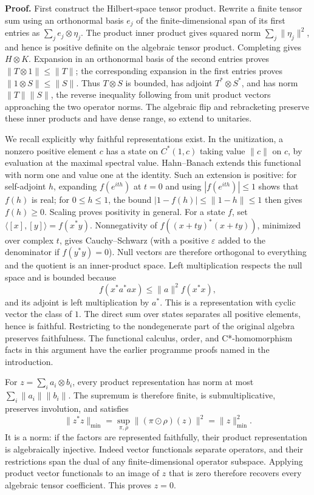 \documentclass[
  11pt,
]{article}
\begin{document}
\textbf{Proof.} First construct the Hilbert-space tensor product.
Rewrite a finite tensor sum using an orthonormal basis \(e_j\) of the
finite-dimensional span of its first entries as
\(\sum_j e_j\otimes\eta_j\). The product inner product gives squared
norm \(\sum_j\|\eta_j\|^2\), and hence is positive definite on the
algebraic tensor product. Completing gives \(H\otimes K\). Expansion in
an orthonormal basis of the second entries proves
\(\|T\otimes1\|\leq\|T\|\); the corresponding expansion in the first
entries proves \(\|1\otimes S\|\leq\|S\|\). Thus \(T\otimes S\) is
bounded, has adjoint \(T^*\otimes S^*\), and has norm \(\|T\|\|S\|\),
the reverse inequality following from unit product vectors approaching
the two operator norms. The algebraic flip and rebracketing preserve
these inner products and have dense range, so extend to unitaries.

We recall explicitly why faithful representations exist. In the
unitization, a nonzero positive element \(c\) has a state on
\(C^*(1,c)\) taking value \(\|c\|\) on \(c\), by evaluation at the
maximal spectral value. Hahn--Banach extends this functional with norm
one and value one at the identity. Such an extension is positive: for
self-adjoint \(h\), expanding \(f(e^{ith})\) at \(t=0\) and using
\(|f(e^{ith})|\leq1\) shows that \(f(h)\) is real; for \(0\leq h\leq1\),
the bound \(|1-f(h)|\leq\|1-h\|\leq1\) then gives \(f(h)\geq0\). Scaling
proves positivity in general. For a state \(f\), set
\(\langle[x],[y]\rangle=f(x^*y)\). Nonnegativity of
\(f((x+ty)^*(x+ty))\), minimized over complex \(t\), gives
Cauchy--Schwarz (with a positive \(\varepsilon\) added to the
denominator if \(f(y^*y)=0\)). Null vectors are therefore orthogonal to
everything and the quotient is an inner-product space. Left
multiplication respects the null space and is bounded because \[
f(x^*a^*ax)\leq\|a\|^2f(x^*x),
\] and its adjoint is left multiplication by \(a^*\). This is a
representation with cyclic vector the class of \(1\). The direct sum
over states separates all positive elements, hence is faithful.
Restricting to the nondegenerate part of the original algebra preserves
faithfulness. The functional calculus, order, and C*-homomorphism facts
in this argument have the earlier programme proofs named in the
introduction.

For \(z=\sum_i a_i\otimes b_i\), every product representation has norm
at most \(\sum_i\|a_i\|\|b_i\|\). The supremum is therefore finite, is
submultiplicative, preserves involution, and satisfies \[
\|z^*z\|_{\min}=\sup_{\pi,\rho}\|(\pi\odot\rho)(z)\|^2
=\|z\|_{\min}^2.
\] It is a norm: if the factors are represented faithfully, their
product representation is algebraically injective. Indeed vector
functionals separate operators, and their restrictions span the dual of
any finite-dimensional operator subspace. Applying product vector
functionals to an image of \(z\) that is zero therefore recovers every
algebraic tensor coefficient. This proves \(z=0\).
\end{document}
